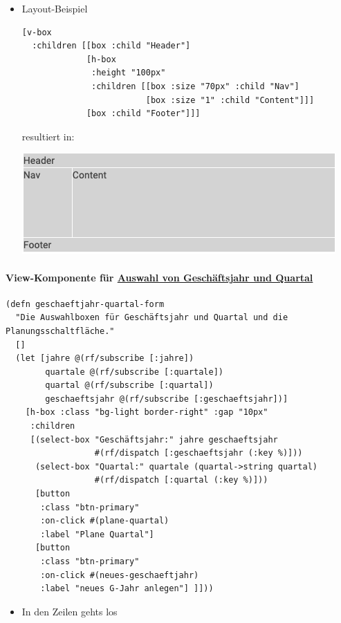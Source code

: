 \documentclass[a4paper]{article}
\begin{document}
\begin{itemize}
\item Layout-Beispiel
\begin{small}
\begin{verbatim}
[v-box
  :children [[box :child "Header"]
             [h-box
              :height "100px"
              :children [[box :size "70px" :child "Nav"]
                         [box :size "1" :child "Content"]]]
             [box :child "Footer"]]]
\end{verbatim}
\end{small}
resultiert in:
\begin{center}
\includegraphics[width=.9\linewidth]{./Abbildungen/layout.png}
\end{center}
\end{itemize}

\paragraph*{View-Komponente für \href{http://localhost:9500/}{Auswahl von Geschäftsjahr und Quartal}}
\label{sec:org8ea9dc5}
\begin{verbatim}
(defn geschaeftjahr-quartal-form 
  "Die Auswahlboxen für Geschäftsjahr und Quartal und die Planungsschaltfläche."
  []
  (let [jahre @(rf/subscribe [:jahre])
        quartale @(rf/subscribe [:quartale])
        quartal @(rf/subscribe [:quartal])
        geschaeftsjahr @(rf/subscribe [:geschaeftsjahr])]
    [h-box :class "bg-light border-right" :gap "10px"
     :children
     [(select-box "Geschäftsjahr:" jahre geschaeftsjahr
                  #(rf/dispatch [:geschaeftsjahr (:key %)]))
      (select-box "Quartal:" quartale (quartal->string quartal)
                  #(rf/dispatch [:quartal (:key %)]))
      [button
       :class "btn-primary"
       :on-click #(plane-quartal)
       :label "Plane Quartal"]
      [button
       :class "btn-primary"
       :on-click #(neues-geschaeftjahr)
       :label "neues G-Jahr anlegen"] ]]))
\end{verbatim}
\begin{itemize}
\item In den Zeilen  gehts los
\end{itemize}
\end{document}
